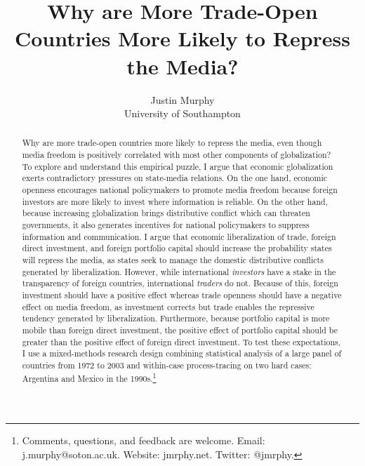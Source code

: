 \documentclass[12pt,a4paper]{article}\usepackage[]{graphicx}\usepackage[]{color}
\begin{document}
\title{Why are More Trade-Open Countries More Likely to Repress the Media?}

\author{Justin Murphy\\
University of Southampton}

\maketitle

\begin{singlespace}
\begin{abstract}
Why are more trade-open countries more likely to repress the media, even though media freedom is positively correlated with most other components of globalization? To explore and understand this empirical puzzle, I argue that economic globalization exerts contradictory pressures on state-media relations. On the one hand, economic openness encourages national policymakers to promote media freedom because foreign investors are more likely to invest where information is reliable. On the other hand, because increasing globalization brings distributive conflict which can threaten governments, it also generates incentives for national policymakers to suppress information and communication. I argue that economic liberalization of trade, foreign direct investment, and foreign portfolio capital should increase the probability states will repress the media, as states seek to manage the domestic distributive conflicts generated by liberalization. However, while international \emph{investors} have a stake in the transparency of foreign countries, international \emph{traders} do not. Because of this, foreign investment should have a positive effect whereas trade openness should have a negative effect on media freedom, as investment corrects but trade enables the repressive tendency generated by liberalization. Furthermore, because portfolio capital is more mobile than foreign direct investment, the positive effect of portfolio capital should be greater than the positive effect of foreign direct investment. To test these expectations, I use a mixed-methods research design combining statistical analysis of a large panel of countries from 1972 to 2003 and within-case process-tracing on two hard cases: Argentina and Mexico in the 1990s.\footnote{Comments, questions, and feedback are welcome. Email: j.murphy@soton.ac.uk. Website: jmrphy.net. Twitter: @jmrphy.}
\end{abstract}
\end{singlespace}
\end{document}
